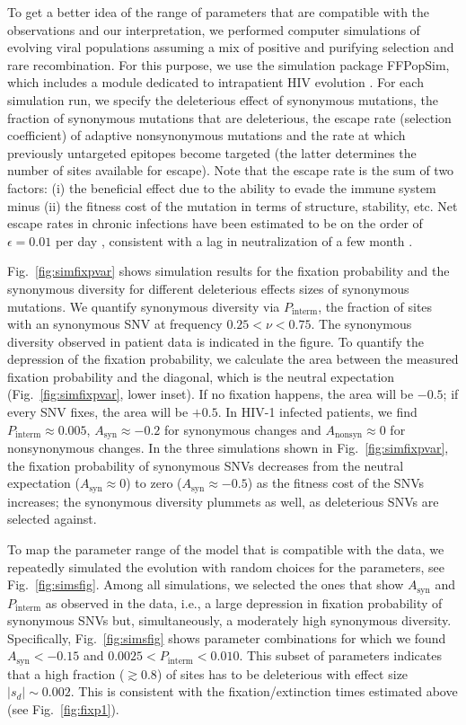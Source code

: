\documentclass[11pt]{article}
\newcommand{\FIG}[1]{Fig.~\ref{fig:#1}}
\begin{document}
To get a better idea of the range of parameters that are compatible with the
observations and our interpretation, we performed computer simulations of
evolving viral populations assuming a mix of positive and purifying selection
and rare recombination.  For this purpose, we use the simulation package
FFPopSim, which includes a module dedicated to intrapatient HIV evolution
\citep{zanini_ffpopsim:_2012}. For each simulation run, we specify the
deleterious effect of synonymous mutations, the fraction of synonymous mutations
that are deleterious, the escape rate (selection coefficient) of adaptive
nonsynonymous mutations and the rate at which previously untargeted epitopes
become targeted (the latter determines the number of sites available for
escape). Note that the escape rate is the sum of two factors: (i) the beneficial
effect due to the ability to evade the immune system minus (ii) the fitness cost
of the mutation in terms of structure, stability, etc. Net escape rates in
chronic infections have been estimated to be on the order of $\epsilon = 0.01$
per day \citep{neher_recombination_2010, Asquith:2006p28003}, consistent
with a lag in neutralization of a few month \citep{richman_rapid_2003}.

\FIG{simfixpvar} shows simulation results for the fixation probability and the
synonymous diversity for different deleterious effects sizes of synonymous mutations.
We quantify synonymous diversity via $P_\text{interm}$, the fraction of sites
with an synonymous SNV at frequency $0.25 < \nu < 0.75$. The synonymous diversity
observed in patient data is indicated in the figure. To quantify the depression
of the fixation probability, we calculate the area between the measured fixation
probability and the diagonal, which is the neutral expectation
(\FIG{simfixpvar}, lower inset). If no fixation happens, the area will be
$-0.5$; if every SNV fixes, the area will be $+0.5$. In HIV-1 infected
patients, we find $P_\text{interm} \approx 0.005$, $A_\text{syn} \approx -0.2$
for synonymous changes and $A_\text{nonsyn} \approx 0$ for nonsynonymous
changes. In the three simulations shown in \FIG{simfixpvar}, the fixation
probability of synonymous SNVs decreases from the neutral expectation
($A_\text{syn} \approx 0$) to zero ($A_\text{syn} \approx -0.5$) as the
fitness cost of the SNVs increases; the synonymous diversity plummets as well, as
deleterious SNVs are selected against.

To map the parameter range of the model that is compatible with the data, we
repeatedly simulated the evolution with random choices for the
parameters, see \FIG{simsfig}. Among all simulations, we selected the ones
that show $A_\text{syn}$ and $P_\text{interm}$ as observed in the data, i.e., a
large depression in fixation probability of synonymous SNVs but, simultaneously,
a moderately high synonymous diversity. Specifically, \FIG{simsfig} shows
parameter combinations for which we found $A_\text{syn} < -0.15$ and $0.0025 <
P_\text{interm} < 0.010$. This subset of parameters indicates that a high fraction
($\gtrsim 0.8$) of sites has to be deleterious with effect size $|s_d| \sim
0.002$. This is consistent with the fixation/extinction times estimated above
(see \FIG{fixp1}). 
\end{document}
